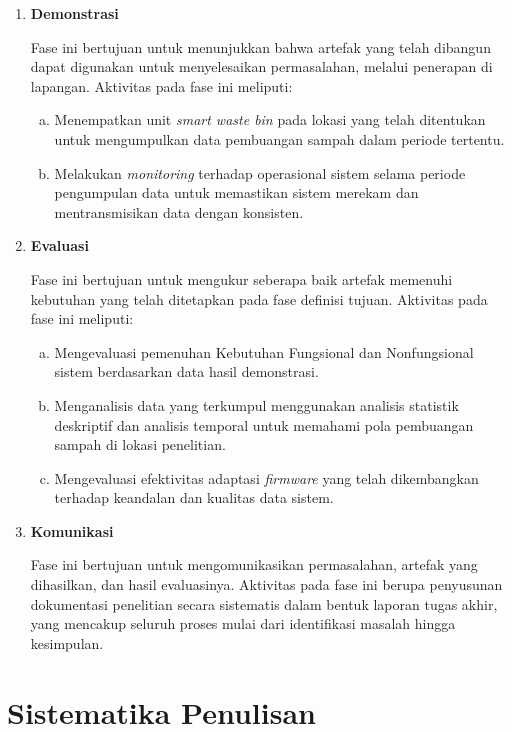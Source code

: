 \begin{enumerate}
    \item \textbf{Demonstrasi}

    Fase ini bertujuan untuk menunjukkan bahwa artefak yang telah dibangun dapat digunakan untuk menyelesaikan permasalahan, melalui penerapan di lapangan. Aktivitas pada fase ini meliputi:
    \begin{enumerate}[a.]
        \item Menempatkan unit \textit{smart waste bin} pada lokasi yang telah ditentukan untuk mengumpulkan data pembuangan sampah dalam periode tertentu.
        \item Melakukan \textit{monitoring} terhadap operasional sistem selama periode pengumpulan data untuk memastikan sistem merekam dan mentransmisikan data dengan konsisten.
    \end{enumerate}

    \item \textbf{Evaluasi}

    Fase ini bertujuan untuk mengukur seberapa baik artefak memenuhi kebutuhan yang telah ditetapkan pada fase definisi tujuan. Aktivitas pada fase ini meliputi:
    \begin{enumerate}[a.]
        \item Mengevaluasi pemenuhan Kebutuhan Fungsional dan Nonfungsional sistem berdasarkan data hasil demonstrasi.
        \item Menganalisis data yang terkumpul menggunakan analisis statistik deskriptif dan analisis temporal untuk memahami pola pembuangan sampah di lokasi penelitian.
        \item Mengevaluasi efektivitas adaptasi \textit{firmware} yang telah dikembangkan terhadap keandalan dan kualitas data sistem.
    \end{enumerate}

    \item \textbf{Komunikasi}

    Fase ini bertujuan untuk mengomunikasikan permasalahan, artefak yang dihasilkan, dan hasil evaluasinya. Aktivitas pada fase ini berupa penyusunan dokumentasi penelitian secara sistematis dalam bentuk laporan tugas akhir, yang mencakup seluruh proses mulai dari identifikasi masalah hingga kesimpulan.
    \vfill
\end{enumerate}

\section{Sistematika Penulisan}

